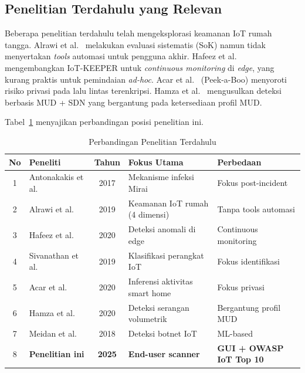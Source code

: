 \documentclass[conference]{IEEEtran}
\begin{document}
\subsection{Penelitian Terdahulu yang Relevan}

Beberapa penelitian terdahulu telah mengeksplorasi keamanan IoT rumah tangga. Alrawi et al.\ \cite{alrawi2019} melakukan evaluasi sistematis (SoK) namun tidak menyertakan \textit{tools} automasi untuk pengguna akhir. Hafeez et al.\ \cite{hafeez2020} mengembangkan IoT-KEEPER untuk \textit{continuous monitoring} di \textit{edge}, yang kurang praktis untuk pemindaian \textit{ad-hoc}. Acar et al.\ \cite{acar2020} (Peek-a-Boo) menyoroti risiko privasi pada lalu lintas terenkripsi. Hamza et al.\ \cite{hamza2020} mengusulkan deteksi berbasis MUD + SDN yang bergantung pada ketersediaan profil MUD.

Tabel\ \ref{tab:terdahulu} menyajikan perbandingan posisi penelitian ini.

\begin{table}[htbp]
\caption{Perbandingan Penelitian Terdahulu}
\label{tab:terdahulu}
\renewcommand{\arraystretch}{1.2}
\begin{tabularx}{\columnwidth}{|c|l|c|X|X|}
\hline
\textbf{No} & \textbf{Peneliti} & \textbf{Tahun} & \textbf{Fokus Utama} & \textbf{Perbedaan} \\
\hline
1 & Antonakakis et al.\ \cite{antonakakis2017} & 2017 & Mekanisme infeksi Mirai & Fokus post-incident \\
\hline
2 & Alrawi et al.\ \cite{alrawi2019} & 2019 & Keamanan IoT rumah (4 dimensi) & Tanpa tools automasi \\
\hline
3 & Hafeez et al.\ \cite{hafeez2020} & 2020 & Deteksi anomali di edge & Continuous monitoring \\
\hline
4 & Sivanathan et al.\ \cite{sivanathan2019} & 2019 & Klasifikasi perangkat IoT & Fokus identifikasi \\
\hline
5 & Acar et al.\ \cite{acar2020} & 2020 & Inferensi aktivitas smart home & Fokus privasi \\
\hline
6 & Hamza et al.\ \cite{hamza2020} & 2020 & Deteksi serangan volumetrik & Bergantung profil MUD \\
\hline
7 & Meidan et al.\ \cite{meidan2018} & 2018 & Deteksi botnet IoT & ML-based \\
\hline
8 & \textbf{Penelitian ini} & \textbf{2025} & \textbf{End-user scanner} & \textbf{GUI + OWASP IoT Top 10} \\
\hline
\end{tabularx}
\end{table}
\end{document}
